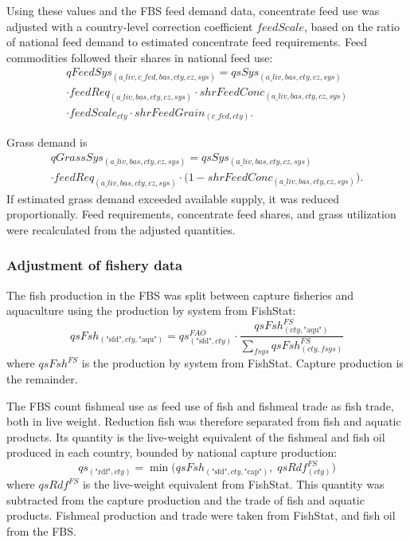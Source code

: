 Using these values and the FBS feed demand data, concentrate feed use was adjusted with a country-level correction coefficient \(feedScale\), based on the ratio of national feed demand to estimated concentrate feed requirements. Feed commodities followed their shares in national feed use:
\begin{multline}
qFeedSys_{(a\_liv,c\_fed,bas,cty,cz,sys)}
= qsSys_{(a\_liv,bas,cty,cz,sys)}
\\[-0.3em]
\cdot feedReq_{(a\_liv,bas,cty,cz,sys)}
\cdot shrFeedConc_{(a\_liv,bas,cty,cz,sys)}
\\[-0.3em]
\cdot feedScale_{cty}\cdot shrFeedGrain_{(c\_fed,cty)}.
\end{multline}

Grass demand is
\begin{multline}
qGrassSys_{(a\_liv,bas,cty,cz,sys)}
= qsSys_{(a\_liv,bas,cty,cz,sys)}
\\[-0.3em]
\cdot feedReq_{(a\_liv,bas,cty,cz,sys)}
\cdot\bigl(1-shrFeedConc_{(a\_liv,bas,cty,cz,sys)}\bigr).
\end{multline}
If estimated grass demand exceeded available supply, it was reduced proportionally. Feed requirements, concentrate feed shares, and grass utilization were recalculated from the adjusted quantities.


\subsubsection{Adjustment of fishery data}

The fish production in the FBS was split between capture fisheries and aquaculture using the production by system from FishStat:
\begin{equation}
qsFsh_{(\text{"sfd"},cty,\text{"aqu"})} = qs^{FAO}_{(\text{"sfd"},cty)} \cdot
\frac{qsFsh^{FS}_{(cty,\text{"aqu"})}}{\sum_{fsys} qsFsh^{FS}_{(cty,fsys)}}
\end{equation}
where \( qsFsh^{FS} \) is the production by system from FishStat. Capture production is the remainder.

The FBS count fishmeal use as feed use of fish and fishmeal trade as fish trade, both in live weight. 
Reduction fish was therefore separated from fish and aquatic products. 
Its quantity is the live-weight equivalent of the fishmeal and fish oil produced in each country, bounded by national capture production:
\begin{equation}
qs_{(\text{"rdf"},cty)} = \min\bigl(qsFsh_{(\text{"sfd"},cty,\text{"cap"})},\; qsRdf^{FS}_{(cty)}\bigr)
\end{equation}
where \( qsRdf^{FS} \) is the live-weight equivalent from FishStat. 
This quantity was subtracted from the capture production and the trade of fish and aquatic products. 
Fishmeal production and trade were taken from FishStat, and fish oil from the FBS.

